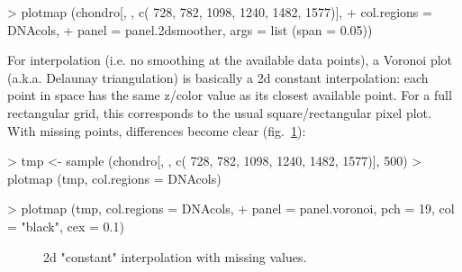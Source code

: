 \documentclass[english, a4paper, 10pt, headings=small, DIV11]{scrartcl}
\renewenvironment{Schunk}{\vspace{0pt}\begin{small}}{\end{small}\vspace{0pt}}
\begin{document}
\begin{Schunk}
\begin{Sinput}
> plotmap (chondro[, , c( 728, 782, 1098, 1240, 1482, 1577)],
+        col.regions = DNAcols,
+        panel = panel.2dsmoother, args = list (span = 0.05))
\end{Sinput}
\end{Schunk}

For interpolation (i.e. no smoothing at the available data points), a Voronoi plot  (a.k.a. Delaunay triangulation) is basically a 2d constant interpolation: each point in space has the same z/color value as its closest available point. For a full rectangular grid, this corresponds to the usual square/rectangular pixel plot. With missing points, differences become clear (fig.~\ref{fig:DNAmissing}):

\begin{Schunk}
\begin{Sinput}
> tmp <- sample (chondro[, , c( 728, 782, 1098, 1240, 1482, 1577)], 500)
> plotmap (tmp, col.regions = DNAcols)
\end{Sinput}
\end{Schunk}
\begin{Schunk}
\begin{Sinput}
> plotmap (tmp, col.regions = DNAcols,
+         panel = panel.voronoi, pch = 19, col = "black", cex = 0.1)
\end{Sinput}
\end{Schunk}
\begin{figure}[tbh]
\caption{\label{fig:DNAmissing} 2d "constant" interpolation with missing values.}
\end{figure}
\end{document}
